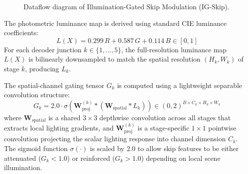 \documentclass[conference]{IEEEtran}
\begin{document}
\begin{figure}[t]
\centering
{}
\caption{Dataflow diagram of Illumination-Gated Skip Modulation (IG-Skip).}
\label{fig:ig_skip_arch}
\end{figure}

The photometric luminance map is derived using standard CIE luminance coefficients:
\begin{equation}
L(X) = 0.299\,R + 0.587\,G + 0.114\,B \in [0, 1]
\end{equation}
For each decoder junction $k \in \{1, \dots, 5\}$, the full-resolution luminance map $L(X)$ is bilinearly downsampled to match the spatial resolution $(H_k, W_k)$ of stage $k$, producing $L_k$.

The spatial-channel gating tensor $G_k$ is computed using a lightweight separable convolution structure:
\begin{equation}
G_k = 2.0 \cdot \sigma\left(\mathbf{W}_{\text{proj}}^{(k)} * \left(\mathbf{W}_{\text{spatial}} * L_k\right)\right) \in (0, 2)^{B \times C_k \times H_k \times W_k}
\end{equation}
where $\mathbf{W}_{\text{spatial}}$ is a shared $3 \times 3$ depthwise convolution across all stages that extracts local lighting gradients, and $\mathbf{W}_{\text{proj}}^{(k)}$ is a stage-specific $1 \times 1$ pointwise convolution projecting the scalar lighting response into channel dimension $C_k$. The sigmoid function $\sigma(\cdot)$ is scaled by $2.0$ to allow skip features to be either attenuated ($G_k < 1.0$) or reinforced ($G_k > 1.0$) depending on local scene illumination.
\end{document}
